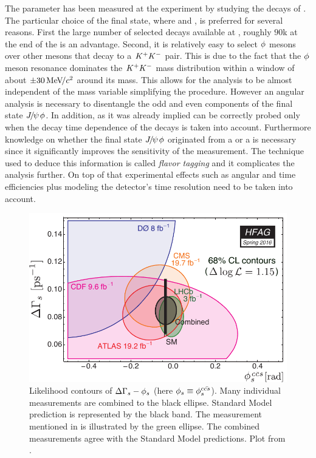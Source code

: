 The parameter \phis has been measured at the \lhcb experiment by studying the decays of \BsJpsiPhi \cite{phis-3fb-paper}.
The particular choice of the final state, where \phiKK and \Jpsimumu, is preferred for several reasons. First the large number
of selected \BsJpsiPhi decays available at \lhcb, roughly $90$k at the end of the \runtwo is an advantage. Second, it is relatively
easy to select $\phi$ mesons over other mesons that decay to a $K^+K^-$ pair. This is due to the fact that the $\phi$ meson resonance dominates
the $K^+K^-$ mass distribution within a window of about $\pm 30 {\mathrm{\,Me\kern -0.1em V\!/}c^2}$ around its mass. This allows for the analysis to be
almost independent of the \mKK mass variable simplifying the procedure. However an angular analysis is necessary
to disentangle the odd and even \CP components of the final state ${J\mskip -3mu/\mskip -2mu\psi\mskip 2mu}\phi$.
In addition, as it was already implied \phis can be correctly probed only when the decay time dependence of the \BsJpsiPhi decays is taken into
account. Furthermore knowledge on whether the final state ${J\mskip -3mu/\mskip -2mu\psi\mskip 2mu}\phi$ originated from a \Bs or a \Bsb is necessary since it
significantly improves the sensitivity of the \phis measurement. The technique used to deduce this information is called {\it flavor tagging}
and it complicates the analysis further. On top of that experimental effects such as angular and time efficiencies plus modeling the
\lhcb detector's time resolution need to be taken into account.

\begin{figure}[h]
  \centering
    \includegraphics[trim=0cm 0cm 0cm 0cm, clip=true, scale=0.8]{Figures/Chapter1/hfag_Spring2016_DGsphis_zoom.pdf}
    \caption{Likelihood contours of $\Delta\Gamma_s-\phi_{s}$ (here $\phi_{s}\equiv \phi_{s}^{c\bar{cs}}$). Many individual measurements are
             combined to the black ellipse. Standard Model prediction is represented by the black band. The \lhcb measurement
             mentioned in  is illustrated by the green ellipse. The combined measurements agree with the Standard Model
             predictions. Plot from \cite{hfag-2014}. }
    \label{hfag_phis_dg}
\end{figure}

